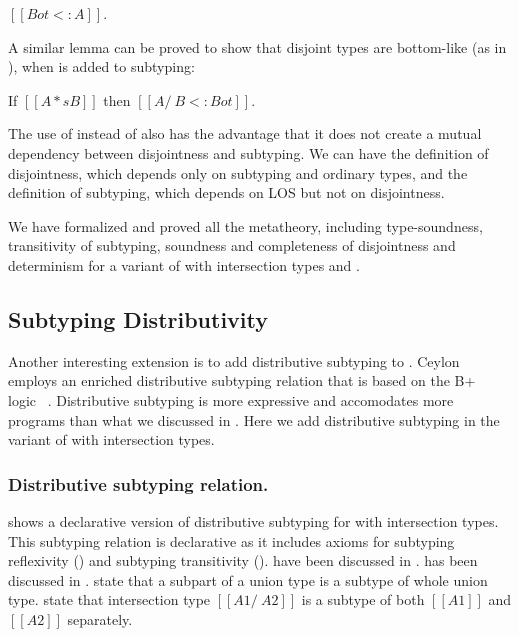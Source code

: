 \begin{lemma}
  $[[Bot <: A]]$.
\label{lemma:discussion:bls}
\end{lemma}

\noindent A similar lemma can be proved to show that disjoint types are bottom-like
(as in ), when  is added to subtyping:

\begin{lemma}
  If $[[A *s B]]$ then $[[A /\ B <: Bot]]$.
\label{lemma:discussion:disjoint-types}
\end{lemma}

\noindent The use of  instead of  also has
the advantage that it does not create a mutual dependency between
disjointness and subtyping. We can have the definition of
disjointness, which depends only on subtyping and ordinary types, and
the definition of subtyping, which depends on LOS but not on
disjointness.

We have formalized and proved all the metatheory, including
type-soundness, transitivity of subtyping, soundness and completeness
of disjointness and determinism for a variant of \name with
intersection types and .

\subsection{Subtyping Distributivity}
\label{sec:inter:dist}

Another interesting extension is to add distributive subtyping to \cal.
Ceylon~\cite{muehlboeck2018empowering} employs an enriched 
distributive subtyping relation that is based on the 
B+ logic~\cite{routley1972semantics,van2000minimal}
.
Distributive subtyping is more expressive and accomodates more programs than what we discussed in
. Here we add distributive subtyping in the variant of \cal with
intersection types. 

\subsubsection*{Distributive subtyping relation.}
 shows a declarative version of distributive subtyping for
\cal with intersection types.
This subtyping relation is declarative as it includes axioms for subtyping reflexivity () and
subtyping transitivity ().  have been
discussed in .  has been discussed in .
 state that a subpart of a union type is a subtype of whole union type.
 state that intersection type $[[A1 /\ A2]]$ is a subtype of both $[[A1]]$
and $[[A2]]$ separately.

